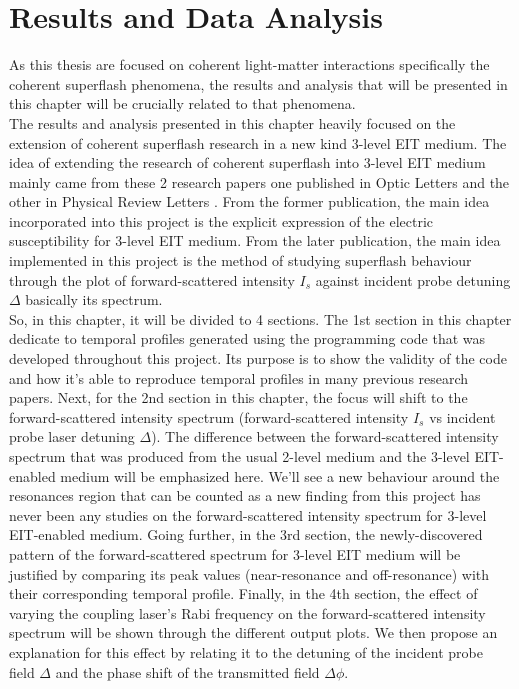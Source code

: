 \chapter{Results and Data Analysis}\label{results and analysis}
As this thesis are focused on coherent light-matter interactions specifically the coherent superflash phenomena, the results and analysis that will be presented in this chapter will be crucially related to that phenomena.\\

The results and analysis presented in this chapter heavily focused on the extension of coherent superflash research in a new kind 3-level EIT medium. The idea of extending the research of coherent superflash into 3-level EIT medium mainly came from these 2 research papers one published in Optic Letters \cite{jeong2010slow} and the other in Physical Review Letters \cite{Kwong2014}. From the former publication, the main idea incorporated into this project is the explicit expression of the electric susceptibility for 3-level EIT medium. From the later publication, the main idea implemented in this project is the method of studying superflash behaviour through the plot of forward-scattered intensity $I_{s}$ against incident probe detuning $\Delta$ basically its spectrum.\\

So, in this chapter, it will be divided to 4 sections. The 1st section in this chapter dedicate to temporal profiles generated using the programming code that was developed throughout this project. Its purpose is to show the validity of the code and how it's able to reproduce temporal profiles in many previous research papers. Next, for the 2nd section in this chapter, the focus will shift to the forward-scattered intensity spectrum (forward-scattered intensity $I_{s}$ vs incident probe laser detuning $\Delta$). The difference between the forward-scattered intensity spectrum that was produced from the usual 2-level medium and the 3-level EIT-enabled medium will be emphasized here. We'll see a new behaviour around the resonances region that can be counted as a new finding from this project has never been any studies on the forward-scattered intensity spectrum for 3-level EIT-enabled medium. Going further, in the 3rd section, the newly-discovered pattern of the forward-scattered spectrum for 3-level EIT medium will be justified by comparing its peak values (near-resonance and off-resonance) with their corresponding temporal profile. Finally, in the 4th section, the effect of varying the coupling laser's Rabi frequency on the forward-scattered intensity spectrum will be shown through the different output plots. We then propose an explanation for this effect by relating it to the detuning of the incident probe field $\Delta$ and the phase shift of the transmitted field $\Delta\phi$.


